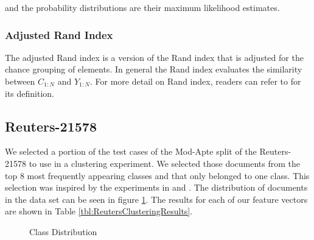 \documentclass[11pt]{article}
\begin{document}
and the probability distributions are their maximum likelihood estimates. 

\subsubsection{Adjusted Rand Index}

The adjusted Rand index is a version of the Rand index that is adjusted for the chance grouping of elements. In general the Rand index evaluates the similarity between $C_{1:N}$ and $Y_{1:N}$. For more detail on Rand index, readers can refer to \cite{Yeung2001} for its definition.

\subsection{Reuters-21578}

We selected a portion of the test cases of the Mod-Apte split of the Reuters-21578 to use in a clustering experiment. We selected those documents from the top 8 most frequently appearing classes and that only belonged to one class. This selection was inspired by the experiments in \cite{Nastase2007} and \cite{Hofmann2000}. The distribution of documents in the data set can be seen in figure \ref{fig:ReutersClassDist}. The results for each of our feature vectors are shown in Table \ref{tbl:ReutersClusteringResults}. 

\begin{figure}[H]
\centering
{}
  \caption{Class Distribution}
  \label{fig:ReutersClassDist}

\end{figure}
\end{document}
